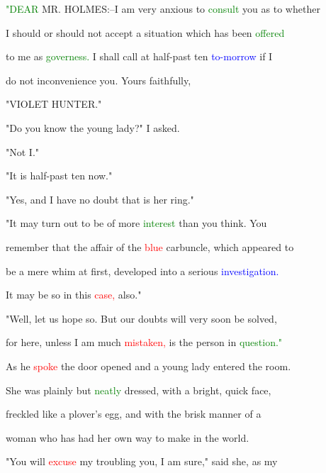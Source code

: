  \textcolor{green}{"DEAR} MR. HOLMES:--I am very \textcolor{BurntOrange}{anxious} to \textcolor{green}{consult} you as to whether

 I should or should not accept a situation which has been \textcolor{green}{offered}

 to me as \textcolor{green}{governess.} I shall call at half-past ten \textcolor{blue}{to-morrow} if I

 do not inconvenience you. Yours faithfully,

 "VIOLET \textcolor{BurntOrange}{HUNTER."}



 "Do you know the \textcolor{BurntOrange}{young} lady?" I asked.



 "Not I."



 "It is half-past ten now."



 "Yes, and I have no \textcolor{BurntOrange}{doubt} that is her ring."



 "It may turn out to be of more \textcolor{green}{interest} than you think. You

 remember that the affair of the \textcolor{red}{blue} carbuncle, which appeared to

 be a mere \textcolor{BurntOrange}{whim} at first, developed into a serious \textcolor{blue}{investigation.}

 It may be so in this \textcolor{red}{case,} also."



 "Well, let us \textcolor{BurntOrange}{hope} so. But our \textcolor{BurntOrange}{doubts} will very soon be solved,

 for here, unless I am much \textcolor{red}{mistaken,} is the person in \textcolor{green}{question."}



 As he \textcolor{red}{spoke} the door opened and a \textcolor{BurntOrange}{young} lady entered the room.

 She was plainly but \textcolor{green}{neatly} dressed, with a bright, quick face,

 freckled like a plover's egg, and with the brisk manner of a

 woman who has had her own way to make in the world.



 "You will \textcolor{red}{excuse} my troubling you, I am sure," said she, as my


